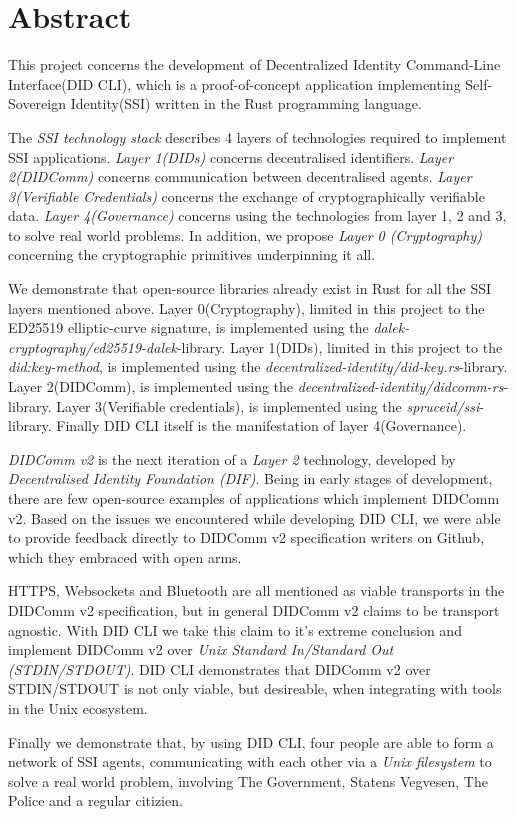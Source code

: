 \chapter*{Abstract}

This project concerns the development of Decentralized Identity Command-Line Interface(DID CLI), which is a proof-of-concept application implementing Self-Sovereign Identity(SSI) written in the Rust programming language.

The \textit{SSI technology stack} describes 4 layers of technologies required to implement SSI applications. \textit{Layer 1(DIDs)} concerns decentralised identifiers. \textit{Layer 2(DIDComm)} concerns communication between decentralised agents. \textit{Layer 3(Verifiable Credentials)} concerns the exchange of cryptographically verifiable data. \textit{Layer 4(Governance)} concerns using the technologies from layer 1, 2 and 3, to solve real world problems. In addition, we propose \textit{Layer 0 (Cryptography)} concerning the cryptographic primitives underpinning it all.


We demonstrate that open-source libraries already exist in Rust for all the SSI layers mentioned above. Layer 0(Cryptography), limited in this project to the ED25519 elliptic-curve signature, is implemented using the \textit{dalek-cryptography/ed25519-dalek}-library. Layer 1(DIDs), limited in this project to the \textit{did:key-method}, is implemented using the \textit{decentralized-identity/did-key.rs}-library. Layer 2(DIDComm), is implemented using the \textit{decentralized-identity/didcomm-rs}-library. Layer 3(Verifiable credentials), is implemented using the \textit{spruceid/ssi}-library. Finally DID CLI itself is the manifestation of layer 4(Governance).


\textit{DIDComm v2} is the next iteration of a \textit{Layer 2} technology, developed by \textit{Decentralised Identity Foundation (DIF)}. Being in early stages of development, there are few open-source examples of applications which implement DIDComm v2. Based on the issues we encountered while developing DID CLI, we were able to provide feedback directly to DIDComm v2 specification writers on Github, which they embraced with open arms.


HTTPS, Websockets and Bluetooth are all mentioned as viable transports in the DIDComm v2 specification, but in general DIDComm v2 claims to be transport agnostic. With DID CLI we take this claim to it's extreme conclusion and implement DIDComm v2 over \textit{Unix Standard In/Standard Out (STDIN/STDOUT)}. DID CLI demonstrates that DIDComm v2 over STDIN/STDOUT is not only viable, but desireable, when integrating with tools in the Unix ecosystem. 

Finally we demonstrate that, by using DID CLI, four people are able to form a network of SSI agents, communicating with each other via a \textit{Unix filesystem} to solve a real world problem, involving The Government, Statens Vegvesen, The Police and a regular citizien.